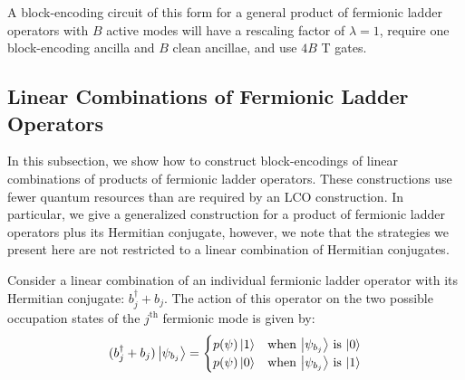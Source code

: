A block-encoding circuit of this form for a general product of fermionic ladder operators with $B$ active modes will have a rescaling factor of $\lambda = 1$, require one block-encoding ancilla and $B$ clean ancillae, and use $4B$ T gates.


\subsection{Linear Combinations of Fermionic Ladder Operators}

In this subsection, we show how to construct block-encodings of linear combinations of products of fermionic ladder operators.
These constructions use fewer quantum resources than are required by an LCO construction.
In particular, we give a generalized construction for a product of fermionic ladder operators plus its Hermitian conjugate, however, we note that the strategies we present here are not restricted to a linear combination of Hermitian conjugates.



Consider a linear combination of an individual fermionic ladder operator with its Hermitian conjugate: $b_j^\dagger + b_j$.
The action of this operator on the two possible occupation states of the $j^\text{th}$ fermionic mode is given by:
\begin{equation}
    \label{eq:action-of-fermionic-op-plus-hc}
    \begin{split}
        (b_j^\dagger + b_j) \ket{\psi_{b_j}} = \begin{cases} 
            p(\psi) \ket{1} & \text{when $\ket{\psi_{b_j}}$ is $\ket{0}$} \\
            p(\psi) \ket{0} & \text{when $\ket{\psi_{b_j}}$ is $\ket{1}$} \\
                                        \end{cases}
    \end{split}
\end{equation}

